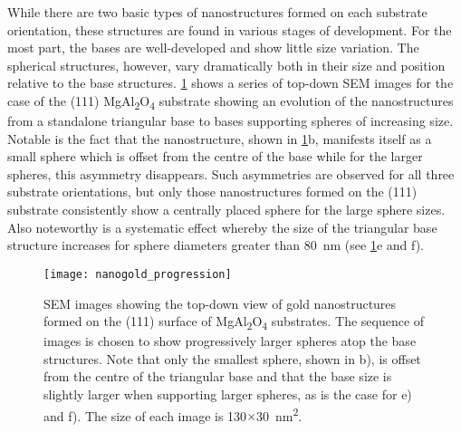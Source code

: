 While there are two basic types of nanostructures formed on each substrate orientation, these structures are found in various stages of development.
For the most part, the bases are well-developed and show little size variation.
The spherical structures, however, vary dramatically both in their size and position relative to the base structures.
\cref{fig:nanogold_progression} shows a series of top-down SEM images for the case of the (111) MgAl\textsubscript{2}O\textsubscript{4} substrate showing an evolution of the nanostructures from a standalone triangular base to bases supporting spheres of increasing size.
Notable is the fact that the nanostructure, shown in \cref{fig:nanogold_progression}b, manifests itself as a small sphere which is offset from the centre of the base while for the larger spheres, this asymmetry disappears.
Such asymmetries are observed for all three substrate orientations, but only those nanostructures formed on the (111) substrate consistently show a centrally placed sphere for the large sphere sizes.
Also noteworthy is a systematic effect whereby the size of the triangular base structure increases for sphere diameters greater than 80~nm (see \cref{fig:nanogold_progression}e and f).
\begin{figure}
 \centering \texttt{[image: nanogold\_progression]}
 \caption[SEM of gold nanostructure growth progression]{\label{fig:nanogold_progression}SEM images showing the top-down view of gold nanostructures formed on the (111) surface of MgAl\textsubscript{2}O\textsubscript{4} substrates.
  The sequence of images is chosen to show progressively larger spheres atop the base structures.
  Note that only the smallest sphere, shown in b), is offset from the centre of the triangular base and that the base size is slightly larger when supporting larger spheres, as is the case for e) and f).
  The size of each image is 130\(\times\)30~nm\textsuperscript{2}.}
\end{figure}

